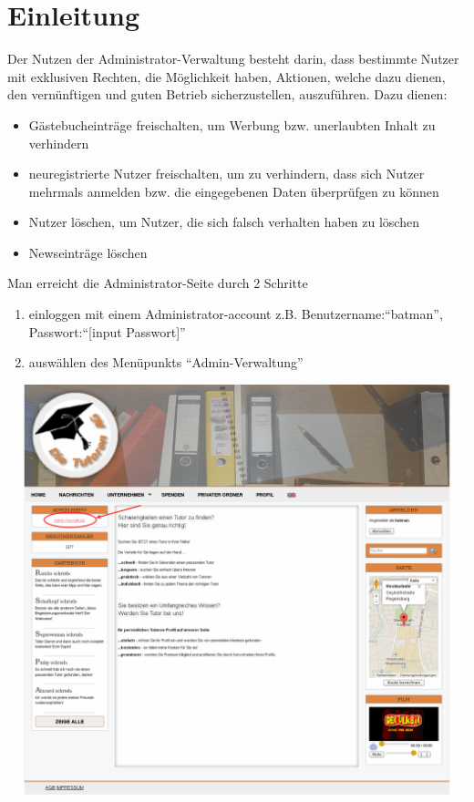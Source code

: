 
\section{Einleitung}
Der Nutzen der Administrator-Verwaltung besteht darin, dass bestimmte Nutzer mit exklusiven Rechten, die Möglichkeit haben, Aktionen, welche dazu dienen, den vernünftigen und guten Betrieb sicherzustellen, auszuführen.
Dazu dienen:
\begin{itemize}
 \item Gästebucheinträge freischalten, um Werbung bzw. unerlaubten Inhalt zu verhindern
 \item neuregistrierte Nutzer freischalten, um zu verhindern, dass sich Nutzer mehrmals anmelden bzw. die eingegebenen Daten überprüfgen zu können
 \item Nutzer löschen, um Nutzer, die sich falsch verhalten haben zu löschen
 \item Newseinträge löschen
\end{itemize}
Man erreicht die Administrator-Seite durch 2 Schritte
\begin{enumerate}
 \item einloggen mit einem Administrator-account z.B. Benutzername:``batman'', Passwort:``[input Passwort]''
 \item auswählen des Menüpunkts ``Admin-Verwaltung''
\end{enumerate}
\includegraphics[width=1\textwidth]{../Screenshots/de/admin/Startseite_logged_in_admin}
